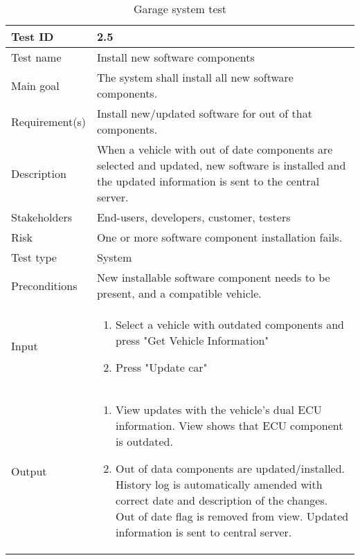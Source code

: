 \begin{table}[H]
\centering
\caption{Garage system test}
\begin{tabularx}{1.0\textwidth}{
    |p{}     %
    |p{}|    %
}
\hline

Test ID
& 2.5
\\
\hline

Test name
& Install new software components
\\
\hline

Main goal
& The system shall install all new software components.
\\
\hline

Requirement(s)
& Install new/updated software for out of that components.
\\
\hline

Description
& When a vehicle with out of date components are selected and updated, new software is installed and the updated information is sent to the central server.
\\
\hline

Stakeholders
& End-users, developers, customer, testers
\\
\hline

Risk
& One or more software component installation fails.
\\
\hline

Test type
& System
\\
\hline

Preconditions
& New installable software component needs to be present, and a compatible vehicle.
\\
\hline

Input
& \begin{enumerate}
    \item Select a vehicle with outdated components and press "Get Vehicle Information"
    \item Press "Update car"
\end{enumerate}
\\
\hline

Output
& \begin{enumerate}
    \item View updates with the vehicle's dual ECU information. View shows that ECU component is outdated.
    \item Out of data components are updated/installed. History log is automatically amended with correct date and description of the changes. Out of date flag is removed from view. Updated information is sent to central server.
\end{enumerate}
\\
\hline


\end{tabularx}
\end{table}

